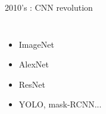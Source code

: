 \documentclass{irdbeamer}
\let\oldcite=\cite
\renewcommand{\cite}[1]{\textcolor[rgb]{.5,.5,.7}{\oldcite{#1}}}
\begin{document}
\begin{frame}[t]{2010's : CNN revolution}
\begin{columns}[t]
    \begin{itemize}
        \item<1-> ImageNet\\ \cite{deng2009imagenet}
        \item<2-> AlexNet\\ \cite{krizhevsky2012imagenet}
        \item<3-> ResNet\\ \cite{he2016deep}
        \item<5-> YOLO, mask-RCNN...\\ \cite{redmon2016you,he2017mask}
    \end{itemize}
\end{columns}
\end{frame}
\end{document}
